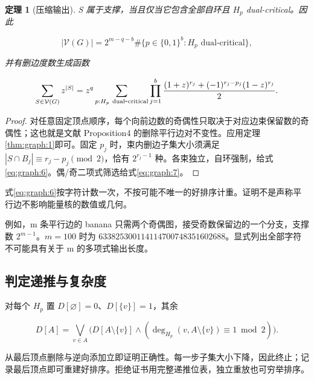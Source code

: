 \documentclass[11pt,a4paper,oneside]{ctexart}
\theoremstyle{cnplain}
\newtheorem{theorem}{定理}[section]
\theoremstyle{definition}
\theoremstyle{remark}
\numberwithin{equation}{section}
\begin{document}
\begin{theorem}[压缩输出]

\label{thm:graph:2} S 属于支撑，当且仅当它包含全部自环且 \(H_p\) dual-critical。因此

\begin{equation}
|\mathcal V(G)|=2^{m-q-b}
    \#\{p\in\{0,1\}^b:H_p\text{ dual-critical}\},             \label{eq:graph:6}
\end{equation}

并有删边度数生成函数

\begin{equation}
\sum_{S\in\mathcal V(G)}z^{|S|}
 =z^q\sum_{p:H_p\ {\rm dual\mbox{-}critical}}
   \prod_{j=1}^b
   \frac{(1+z)^{r_j}+(-1)^{r_j-p_j}(1-z)^{r_j}}2.           \label{eq:graph:7}
\end{equation}

\end{theorem}

\begin{proof}

对任意固定顶点顺序，每个向前边数的奇偶性只取决于对应边束保留数的奇偶性；这也就是文献\cite{dualcritical} Proposition4 的删除平行边对不变性。应用定理\ref{thm:graph:1}即可。固定 \(p_j\) 时，束内删边子集大小须满足 \(|S\cap B_j|\equiv r_j-p_j\pmod2\)，恰有 \(2^{r_j-1}\) 种。各束独立，自环强制，给式\eqref{eq:graph:6}。偶/奇二项式筛选给式\eqref{eq:graph:7}。

\end{proof}

式\eqref{eq:graph:6}按字符计数一次，不按可能不唯一的好排序计重。证明不是声称平行边不影响能量核的数值或几何。

例如，m 条平行边的 banana 只需两个奇偶图，接受奇数保留边的一个分支，支撑数 \(2^{m-1}\)。\(m=100\) 时为 \(633825300114114700748351602688\)。显式列出全部字符不可能具有关于 m 的多项式输出长度。


\subsection{判定递推与复杂度}\label{sec:graph:4}

对每个 \(H_p\) 置 \(D[\varnothing]=0\)、\(D[\{v\}]=1\)，其余

\begin{equation}
D[A]=\bigvee_{v\in A}
   \bigl(D[A\setminus\{v\}]
     \land(\deg_{H_p}(v,A\setminus\{v\})\equiv1\bmod2)\bigr). \label{eq:graph:8}
\end{equation}

从最后顶点删除与逆向添加立即证明正确性。每一步子集大小下降，因此终止；记录最后顶点即可重建好排序。拒绝证书用完整递推位表，独立重放也可穷举排序。
\end{document}
